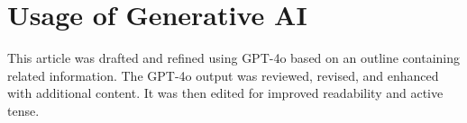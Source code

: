 \documentclass[a4paper, 11pt]{article}
\begin{document}


    \section*{Usage of Generative AI}
    This article was drafted and refined using GPT-4o based on an outline containing related information. The GPT-4o output was reviewed, revised, and enhanced with additional content. It was then edited for improved readability and active tense.
\end{document}
